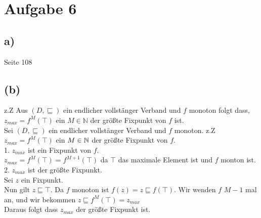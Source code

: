 \section*{Aufgabe 6}

\subsection*{a)}
Seite 108

\subsection*{(b)}
z.Z Aus $(D,\sqsubseteq)$ ein endlicher vollstänger Verband und $f$ monoton folgt dass, $z_{max} = f^M(\top)$ ein $M \in \mathbb{N}$ der größte Fixpunkt von $f$ ist.\\
Sei $(D,\sqsubseteq)$ ein endlicher vollstänger Verband und $f$ monoton.
z.Z $z_{max} = f^M(\top)$ ein $M \in \mathbb{N}$ der größte Fixpunkt von $f$.\\

1. $z_{max}$ ist ein Fixpunkt von $f$.\\
$z_{max} = f^M(\top) = f^{M+1}(\top)$ da $\top$ das maximale Element ist und $f$ monton ist.\\

2. $z_{max}$ ist der größte Fixpunkt.\\
Sei $z$ ein Fixpunkt.\\
Nun gilt $z \sqsubseteq \top$. Da $f$ monoton ist
$f(z) = z  \sqsubseteq f(\top)$. Wir wenden $f$ $M-1$ mal an, und wir bekommen $z  \sqsubseteq f^M(\top) = z_{max} $\\
Daraus folgt dass $ z_{max}$ der größte Fixpunkt ist.




